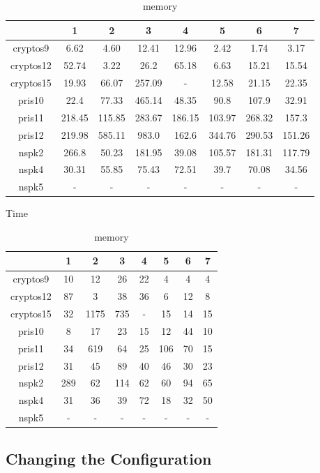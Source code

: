 \documentclass[11pt]{report}
\begin{document}
\begin{table}
\centering
\begin{tabular}{|*{8}{c|}}
\hline
& 1 & 2 & 3 & 4 & 5 & 6 & 7 \\ \hline
cryptos9 & 6.62 & 4.60 & 12.41 & 12.96 & 2.42 & 1.74 & 3.17\\ \hline
cryptos12  & 52.74 & 3.22 & 26.2 & 65.18 & 6.63  & 15.21 & 15.54 \\ \hline
cryptos15   & 19.93 & 66.07 & 257.09 & - & 12.58 & 21.15 & 22.35 \\ \hline
pris10 & 22.4 & 77.33 & 465.14 & 48.35 & 90.8 & 107.9 & 32.91 \\ \hline
pris11 & 218.45 & 115.85 & 283.67 & 186.15 & 103.97 &268.32  & 157.3 \\ \hline
pris12 & 219.98 & 585.11 & 983.0 & 162.6 & 344.76 & 290.53 & 151.26 \\ \hline
nspk2 & 266.8 & 50.23 & 181.95 & 39.08 &105.57 & 181.31 & 117.79 \\ \hline
nspk4 & 30.31 & 55.85 &75.43& 72.51 & 39.7 & 70.08 & 34.56\\ \hline 
nspk5 & - &-  &- & - &- & - & -\\ \hline
\end{tabular}
\caption{Time}
\label{table:defaultdaotime}
\vspace{0.5in}
\centering
\begin{tabular}{|*{8}{c|}}
\hline
& 1 & 2 & 3 & 4 & 5 & 6 & 7 \\ \hline
cryptos9 & 10& 12 & 26 &22  & 4 & 4 & 4\\ \hline
cryptos12 & 87 & 3 & 38 & 36 & 6 &12 & 8 \\ \hline
cryptos15 & 32 & 1175 & 735 & - & 15& 14 & 15\\ \hline
pris10 &8 & 17 &23 & 15 & 12 & 44 & 10\\ \hline
pris11 & 34 & 619 & 64 & 25 & 106 & 70 & 15\\ \hline
pris12 & 31 & 45 & 89 & 40 & 46 & 30 & 23\\ \hline
nspk2 & 289 &62 & 114 & 62 & 60 &94 & 65\\ \hline
nspk4 &31  & 36  &39 & 72 & 18 & 32& 50 \\ \hline
nspk5 &  - & - & -& - & -& - & -\\ \hline
\end{tabular}
\caption{memory}
\label{table:defaultdaomemory}
\end{table}

\subsection{Changing the Configuration}
\end{document}
